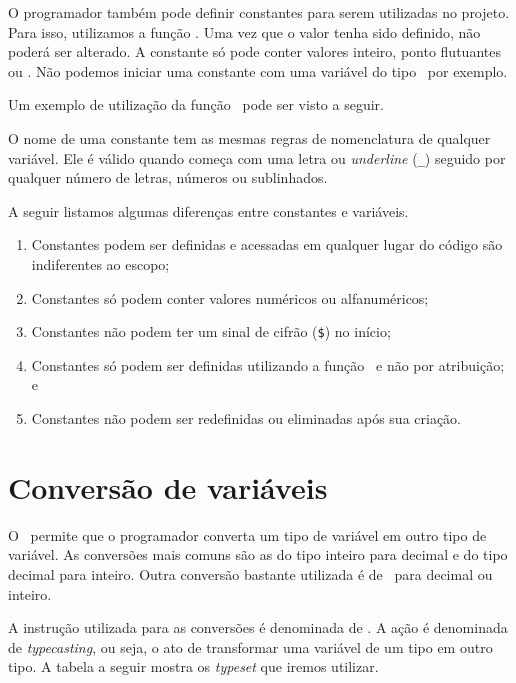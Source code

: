 O programador também pode definir constantes para serem utilizadas no projeto. Para isso,
utilizamos a função \funcaodefine. Uma vez que o valor tenha sido definido, não poderá
ser alterado. A constante só pode conter valores inteiro, ponto flutuantes ou \tipostring.
Não podemos iniciar uma constante com uma variável do tipo \tipoarray~por exemplo.

Um exemplo de utilização da função \funcaodefine~pode ser visto a seguir.




O nome de uma constante tem as mesmas regras de nomenclatura de qualquer variável.
Ele é válido quando começa com uma letra ou \textit{underline} (\texttt{\_}) seguido
por qualquer número de letras, números ou sublinhados.

A seguir listamos algumas diferenças entre constantes e variáveis.

\begin{enumerate}
  \item Constantes podem ser definidas e acessadas em qualquer lugar do código são
  indiferentes ao escopo;
  \item Constantes só podem conter valores numéricos ou alfanuméricos;
  \item Constantes não podem ter um sinal de cifrão (\texttt{\$}) no início;
  \item Constantes só podem ser definidas utilizando a função \funcaodefine~e não por atribuição; e
  \item Constantes não podem ser redefinidas ou eliminadas após sua criação.
\end{enumerate}

\section{Conversão de variáveis}
\label{conversao-de-variaveis}

O \php~permite que o programador converta um tipo de variável em outro tipo de variável.
As conversões mais comuns são as do tipo inteiro para decimal e do tipo decimal para inteiro.
Outra conversão bastante utilizada é de \tipostring~para decimal ou inteiro.

A instrução utilizada para as conversões é denominada de \funcaotypeset. A ação é denominada
de \textit{typecasting}, ou seja, o ato de transformar uma variável de um tipo em outro tipo. A
tabela a seguir mostra os \textit{typeset} que iremos utilizar.

